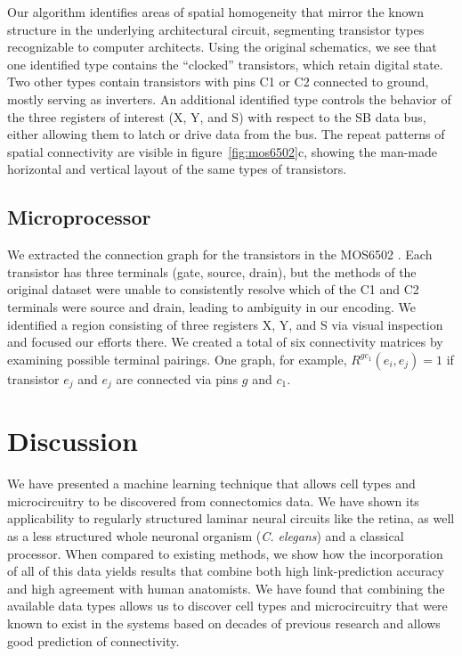 \documentclass{article}
\begin{document}
Our algorithm identifies areas of spatial homogeneity that mirror the
known structure in the underlying architectural circuit, segmenting
transistor types recognizable to computer architects. Using the
original schematics, we see that one identified type contains the
``clocked'' transistors, which retain digital state. Two other types
contain transistors with pins C1 or C2 connected to ground, mostly
serving as inverters.  An additional identified type controls the
behavior of the three registers of interest (X, Y, and S) with respect
to the SB data bus, either allowing them to latch or drive data from
the bus. The repeat patterns of spatial connectivity are visible in
figure~\ref{fig:mos6502}c, showing the man-made horizontal and
vertical layout of the same types of transistors.

\subsection*{Microprocessor}
We extracted the connection graph for the transistors in the MOS6502
\autocite{visual6502source}. Each transistor has three terminals (gate,
source, drain), but the methods of the original dataset were unable to
consistently resolve which of the C1 and C2 terminals were source and
drain, leading to ambiguity in our encoding. We identified a region
consisting of three registers X, Y, and S via visual
inspection and focused our efforts there. We created a total of six
connectivity matrices by examining possible terminal pairings. One
graph, for example, $R^{gc_1}(e_i, e_j)=1$ if transistor $e_j$ and
$e_j$ are connected via pins $g$ and $c_1$. 

\section*{Discussion}
We have presented a machine learning technique that allows cell types
and microcircuitry to be discovered from connectomics data.  We have
shown its applicability to regularly structured laminar neural
circuits like the retina, as well as a less structured whole neuronal
organism (\textit{C. elegans}) and a classical processor. When
compared to existing methods, we show how the incorporation of all of
this data yields results that combine both high link-prediction
accuracy and high agreement with human anatomists. We have found that
combining the available data types allows us to discover cell types
and microcircuitry that were known to exist in the systems based on
decades of previous research and allows good prediction of
connectivity.
\end{document}
